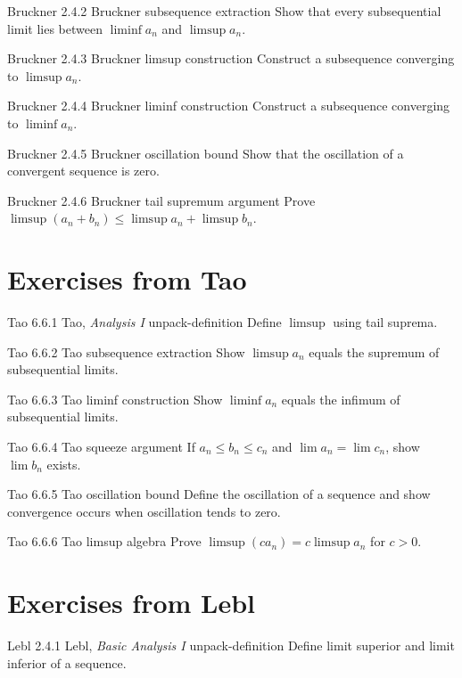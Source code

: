 \exstub
{Bruckner 2.4.2}
{Bruckner}
{subsequence extraction}
{Show that every subsequential limit lies between
$\liminf a_n$ and $\limsup a_n$.}

\exstub
{Bruckner 2.4.3}
{Bruckner}
{limsup construction}
{Construct a subsequence converging to $\limsup a_n$.}

\exstub
{Bruckner 2.4.4}
{Bruckner}
{liminf construction}
{Construct a subsequence converging to $\liminf a_n$.}

\exstub
{Bruckner 2.4.5}
{Bruckner}
{oscillation bound}
{Show that the oscillation of a convergent sequence is zero.}

\exstub
{Bruckner 2.4.6}
{Bruckner}
{tail supremum argument}
{Prove $\limsup (a_n+b_n) \le \limsup a_n + \limsup b_n$.}


\section*{Exercises from Tao}

\exstub
{Tao 6.6.1}
{Tao, \textit{Analysis I}}
{unpack-definition}
{Define $\limsup$ using tail suprema.}

\exstub
{Tao 6.6.2}
{Tao}
{subsequence extraction}
{Show $\limsup a_n$ equals the supremum of subsequential limits.}

\exstub
{Tao 6.6.3}
{Tao}
{liminf construction}
{Show $\liminf a_n$ equals the infimum of subsequential limits.}

\exstub
{Tao 6.6.4}
{Tao}
{squeeze argument}
{If $a_n \le b_n \le c_n$ and
$\lim a_n = \lim c_n$, show $\lim b_n$ exists.}

\exstub
{Tao 6.6.5}
{Tao}
{oscillation bound}
{Define the oscillation of a sequence and show convergence
occurs when oscillation tends to zero.}

\exstub
{Tao 6.6.6}
{Tao}
{limsup algebra}
{Prove $\limsup (c a_n)=c\limsup a_n$ for $c>0$.}


\section*{Exercises from Lebl}

\exstub
{Lebl 2.4.1}
{Lebl, \textit{Basic Analysis I}}
{unpack-definition}
{Define limit superior and limit inferior of a sequence.}

